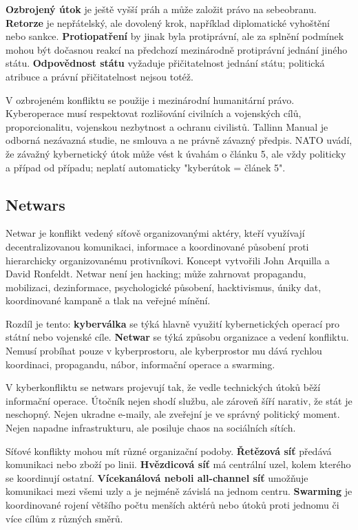 \documentclass[11pt,a4paper]{article}
\begin{document}
\textbf{Ozbrojený útok} je ještě vyšší práh a může založit právo na sebeobranu. \textbf{Retorze} je nepřátelský, ale dovolený krok, například diplomatické vyhoštění nebo sankce. \textbf{Protiopatření} by jinak byla protiprávní, ale za splnění podmínek mohou být dočasnou reakcí na předchozí mezinárodně protiprávní jednání jiného státu. \textbf{Odpovědnost státu} vyžaduje přičitatelnost jednání státu; politická atribuce a právní přičitatelnost nejsou totéž.

V ozbrojeném konfliktu se použije i mezinárodní humanitární právo. Kyberoperace musí respektovat rozlišování civilních a vojenských cílů, proporcionalitu, vojenskou nezbytnost a ochranu civilistů. Tallinn Manual je odborná nezávazná studie, ne smlouva a ne právně závazný předpis. NATO uvádí, že závažný kybernetický útok může vést k úvahám o článku 5, ale vždy politicky a případ od případu; neplatí automaticky "kyberútok = článek 5".

\subsection*{Netwars}
Netwar je konflikt vedený síťově organizovanými aktéry, kteří využívají decentralizovanou komunikaci, informace a koordinované působení proti hierarchicky organizovanému protivníkovi. Koncept vytvořili John Arquilla a David Ronfeldt. Netwar není jen hacking; může zahrnovat propagandu, mobilizaci, dezinformace, psychologické působení, hacktivismus, úniky dat, koordinované kampaně a tlak na veřejné mínění.

Rozdíl je tento: \textbf{kyberválka} se týká hlavně využití kybernetických operací pro státní nebo vojenské cíle. \textbf{Netwar} se týká způsobu organizace a vedení konfliktu. Nemusí probíhat pouze v kyberprostoru, ale kyberprostor mu dává rychlou koordinaci, propagandu, nábor, informační operace a swarming.

V kyberkonfliktu se netwars projevují tak, že vedle technických útoků běží informační operace. Útočník nejen shodí službu, ale zároveň šíří narativ, že stát je neschopný. Nejen ukradne e-maily, ale zveřejní je ve správný politický moment. Nejen napadne infrastrukturu, ale posiluje chaos na sociálních sítích.

Síťové konflikty mohou mít různé organizační podoby. \textbf{Řetězová síť} předává komunikaci nebo zboží po linii. \textbf{Hvězdicová síť} má centrální uzel, kolem kterého se koordinují ostatní. \textbf{Vícekanálová neboli all-channel síť} umožňuje komunikaci mezi všemi uzly a je nejméně závislá na jednom centru. \textbf{Swarming} je koordinované rojení většího počtu menších aktérů nebo útoků proti jednomu či více cílům z různých směrů.
\end{document}
